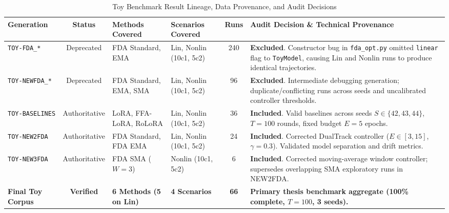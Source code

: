 \documentclass[10pt,a4paper]{article}
\begin{document}
\begin{table}[H]
\centering
\caption{Toy Benchmark Result Lineage, Data Provenance, and Audit Decisions}
\label{tab:toy_lineage}
\scriptsize
\setlength{\tabcolsep}{3.5pt}
\begin{tabularx}{\textwidth}{lcp{3.0cm}p{2.8cm}cp{4.2cm}}
\toprule
\textbf{Generation} & \textbf{Status} & \textbf{Methods Covered} & \textbf{Scenarios Covered} & \textbf{Runs} & \textbf{Audit Decision \& Technical Provenance} \\
\midrule
\texttt{TOY-FDA\_*} & Deprecated & FDA Standard, EMA & Lin, Nonlin (10c1, 5c2) & 240 & \textbf{Excluded}. Constructor bug in \texttt{fda\_opt.py} omitted \texttt{linear} flag to \texttt{ToyModel}, causing Lin and Nonlin runs to produce identical trajectories. \\
\texttt{TOY-NEWFDA\_*} & Deprecated & FDA Standard, EMA, SMA & Lin, Nonlin (10c1, 5c2) & 96 & \textbf{Excluded}. Intermediate debugging generation; duplicate/conflicting runs across seeds and uncalibrated controller thresholds. \\
\midrule
\texttt{TOY-BASELINES} & Authoritative & LoRA, FFA-LoRA, RoLoRA & Lin, Nonlin (10c1, 5c2) & 36 & \textbf{Included}. Valid baselines across seeds $S \in \{42, 43, 44\}$, $T=100$ rounds, fixed budget $E=5$ epochs. \\
\texttt{TOY-NEW2FDA} & Authoritative & FDA Standard, FDA EMA & Lin, Nonlin (10c1, 5c2) & 24 & \textbf{Included}. Corrected DualTrack controller ($E \in [3, 15]$, $\gamma=0.3$). Validated model separation and drift metrics. \\
\texttt{TOY-NEW3FDA} & Authoritative & FDA SMA ($W=3$) & Nonlin (10c1, 5c2) & 6 & \textbf{Included}. Corrected moving-average window controller; supersedes overlapping SMA exploratory runs in NEW2FDA. \\
\midrule
\textbf{Final Toy Corpus} & \textbf{Verified} & \textbf{6 Methods (5 on Lin)} & \textbf{4 Scenarios} & \textbf{66} & \textbf{Primary thesis benchmark aggregate (100\% complete, $T=100$, 3 seeds).} \\
\bottomrule
\end{tabularx}
\end{table}
\end{document}
